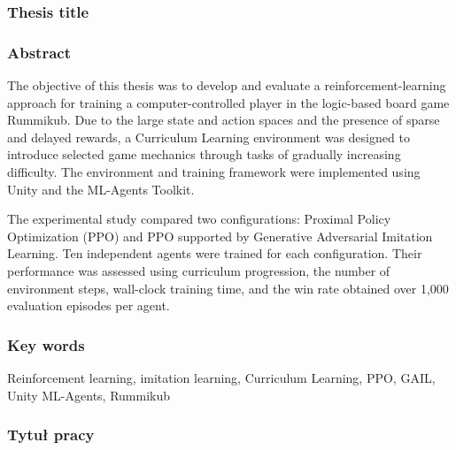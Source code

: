 \subsubsection*{Thesis title}  
\Title

\subsubsection*{Abstract} 
The objective of this thesis was to develop and evaluate a reinforcement-learning approach for training a computer-controlled player in the logic-based board game Rummikub. Due to the large state and action spaces and the presence of sparse and delayed rewards, a Curriculum Learning environment was designed to introduce selected game mechanics through tasks of gradually increasing difficulty. The environment and training framework were implemented using Unity and the ML-Agents Toolkit.

The experimental study compared two configurations: Proximal Policy Optimization (PPO) and PPO supported by Generative Adversarial Imitation Learning. Ten independent agents were trained for each configuration. Their performance was assessed using curriculum progression, the number of environment steps, wall-clock training time, and the win rate obtained over 1,000 evaluation episodes per agent.

\subsubsection*{Key words}  
Reinforcement learning, imitation learning, Curriculum Learning, PPO, GAIL, Unity ML-Agents, Rummikub

\subsubsection*{Tytuł pracy}
\begin{otherlanguage}{polish}
\TitleAlt
\end{otherlanguage}

